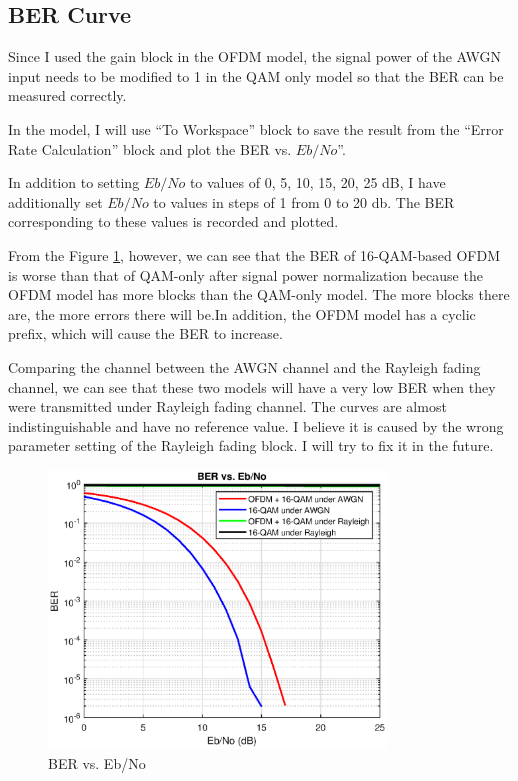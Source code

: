 \documentclass[11pt]{article}
\numberwithin{figure}{section}
\numberwithin{equation}{section}
\begin{document}
\subsection{BER Curve}
Since I used the gain block in the OFDM model, the signal power of the AWGN input needs to be modified to 1 in the QAM only model so that the BER can be measured correctly.

In the model, I will use ``To Workspace'' block to save the result from the ``Error Rate Calculation'' block and plot the BER vs. $Eb/No$''.

In addition to setting $Eb/No$ to values of 0, 5, 10, 15, 20, 25 dB, I have additionally set $Eb/No$ to values in steps of 1 from 0 to 20 db. The BER corresponding to these values is recorded and plotted.

From the Figure \ref{fig:BER}, however, we can see that the BER of 16-QAM-based OFDM is worse than that of QAM-only after signal power normalization because the OFDM model has more blocks than the QAM-only model. The more blocks there are, the more errors there will be.In addition, the OFDM model has a cyclic prefix, which will cause the BER to increase. 

Comparing the channel between the AWGN channel and the Rayleigh fading channel, we can see that these two models will have a very low BER when they were transmitted under Rayleigh fading channel. The curves are almost indistinguishable and have no reference value. I believe it is caused by the wrong parameter setting of the Rayleigh fading block. I will try to fix it in the future.
\begin{figure}[!h]
    \centering
    \includegraphics[width=0.8\textwidth]{images/BER.eps}
    \caption{BER vs. Eb/No}
    \label{fig:BER}
\end{figure}
\end{document}
